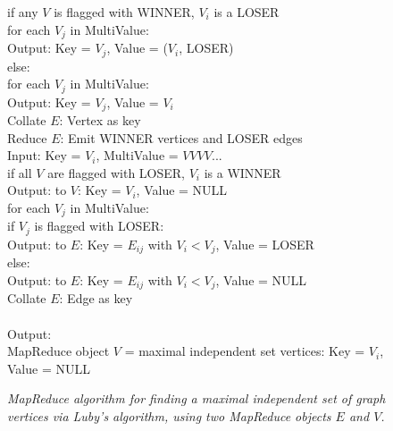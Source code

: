 \begin{figure}[htb]
\begin{center}
{\begin{minipage}{\textwidth}
\begin{tabbing}
       \> \> if any $V$ is flagged with WINNER, $V_i$ is a LOSER \\
       \> \> \> for each $V_j$ in MultiValue: \\
       \> \> \> \> Output: Key = $V_j$, Value = ($V_i$, LOSER) \\
       \> \> else: \\
       \> \> \> for each $V_j$ in MultiValue: \\
       \> \> \> \> Output: Key = $V_j$, Value = $V_i$ \\
 Collate $E$: Vertex as key \\
 Reduce $E$: Emit WINNER vertices and LOSER edges \\
       \> \> Input: Key = $V_i$, MultiValue = $V V V V ...$ \\
       \> \> if all $V$ are flagged with LOSER, $V_i$ is a WINNER \\
       \> \> \> Output: to $V$: Key = $V_i$, Value = NULL \\
       \> \> for each $V_j$ in MultiValue: \\
       \> \> \> if $V_j$ is flagged with LOSER: \\
       \> \> \> \> Output: to $E$: Key = $E_{ij}$ with $V_i < V_j$, Value = LOSER \\
       \> \> \> else: \\
       \> \> \> \> Output: to $E$: Key = $E_{ij}$ with $V_i < V_j$, Value = NULL \\
 Collate $E$: Edge as key \\
\\
Output: \\
\> MapReduce object $V$ = maximal independent set vertices: Key = $V_i$, Value = NULL \\

  \end{tabbing}
 \end{minipage}}\end{center}

 \caption{\it MapReduce algorithm for finding a maximal independent
 set of graph vertices via Luby's algorithm, using two MapReduce
 objects $E$ and $V$.}

 \label{fig:luby}
\end{figure}

